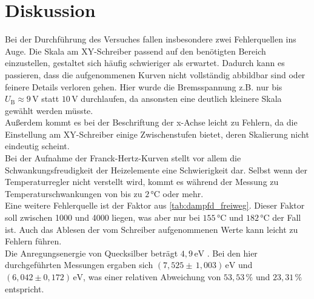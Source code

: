 \section{Diskussion}

Bei der Durchführung des Versuches fallen insbesondere zwei Fehlerquellen ins Auge.
Die Skala am XY-Schreiber passend auf den benötigten Bereich einzustellen, gestaltet sich häufig schwieriger als erwartet.
Dadurch kann es passieren, dass die aufgenommenen Kurven nicht vollständig abbildbar sind oder feinere Details verloren gehen.
Hier wurde die Bremsspannung z.B. nur bis $U_\text{B} \approx 9 \,\unit{\volt}$ statt $10 \,\unit{\volt}$ durchlaufen, da ansonsten eine
deutlich kleinere Skala gewählt werden müsste. \\
Außerdem kommt es bei der Beschriftung der x-Achse leicht zu Fehlern, da die Einstellung am XY-Schreiber einige Zwischenstufen bietet, deren Skalierung nicht eindeutig scheint. \\

Bei der Aufnahme der Franck-Hertz-Kurven stellt vor allem die Schwankungsfreudigkeit der Heizelemente eine Schwierigkeit dar.
Selbst wenn der Temperaturregler nicht verstellt wird, kommt es während der Messung zu Temperaturschwankungen von bis zu $2 \,\unit{\celsius}$ oder mehr. \\

Eine weitere Fehlerquelle ist der Faktor aus \autoref{tab:dampfd_freiweg}. Dieser Faktor soll zwischen 1000 und 4000 liegen, was aber nur bei $155 \, \unit{\celsius}$ und $182 \, \unit{\celsius}$ der Fall ist.
Auch das Ablesen der vom Schreiber aufgenommenen Werte kann leicht zu Fehlern führen. \\

Die Anregungsenergie von Quecksilber beträgt $4,9 \,\unit{\eV}$ \cite{ap09}. 
Bei den hier durchgeführten Messungen ergaben sich $\left( 7,525 \pm \, 1,003\right) \, \unit{\electronvolt}$ und  $ \left(6,042 \pm 0,172 \right)\, \unit{\electronvolt}$, was einer relativen Abweichung von $53,53 \, \%$ und $23,31 \, \%$ entspricht.